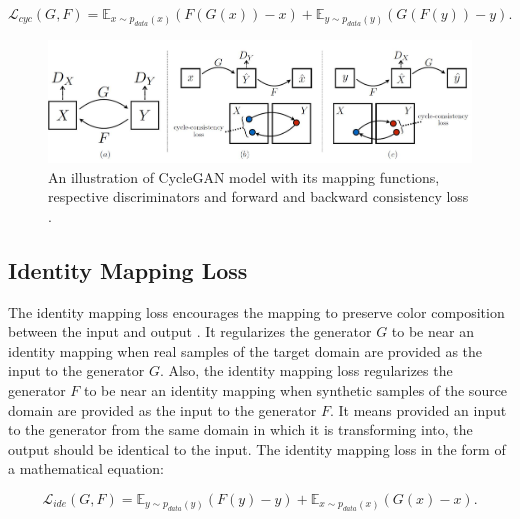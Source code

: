 \begin{equation}\label{CycleConsistencyLossEquation}
    \mathcal{L}_{cyc}(G, F) = \mathbb{E}_{x \sim p_{data}(x)} (F(G(x)) - x) + \mathbb{E}_{y \sim p_{data}(y)} (G(F(y)) - y).
\end{equation}

\begin{figure}[H]
	    \begin{center} \includegraphics[scale=0.5]{images/Methodology/CycleGAN.jpg}
	    \caption[An illustration of \ac{CycleGAN} model with its mapping functions, respective discriminators and forward and backward consistency loss.]{An illustration of \ac{CycleGAN} model with its mapping functions, respective discriminators and forward and backward consistency loss \cite{zhu2020unpaired}.}
	    \label{fig:CycleGAN}
	    \end{center}
\end{figure}

\subsection{Identity Mapping Loss}

The identity mapping loss encourages the mapping to preserve color composition between the input and output \cite{taigman2016unsupervised}. It regularizes the generator $G$ to be near an identity mapping when real samples of the target domain are provided as the input to the generator $G$. Also, the identity mapping loss regularizes the generator $F$ to be near an identity mapping when synthetic samples of the source domain are provided as the input to the generator $F$. It means provided an input to the generator from the same domain in which it is transforming into, the output should be identical to the input. The identity mapping loss in the form of a mathematical equation:

\begin{equation}\label{IdentityMappingLoss}
    \mathcal{L}_{ide}(G, F) = \mathbb{E}_{y \sim p_{data}(y)}(F(y) - y) + \mathbb{E}_{x \sim p_{data}(x)}(G(x) - x).
    \end{equation}

